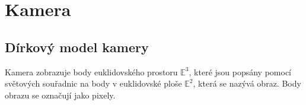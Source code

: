 \documentclass[twoside]{ctuthesis}
\begin{document}



\chapter{Kamera}

\section{Dírkový model kamery}
Kamera zobrazuje body euklidovského prostoru $\mathbb{E}^3$, které jsou popsány pomocí světových souřadnic na body v euklidovské ploše $\mathbb{E}^2$, která se nazývá obraz. Body obrazu se označují jako pixely. 
\end{document}
